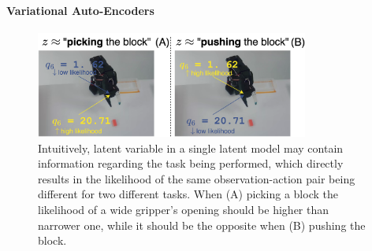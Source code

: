 \paragraph{Variational Auto-Encoders}

\begin{figure}
    \centering
    \includegraphics[width=0.8\textwidth]{figures/ch4/ch4-task-effect-on-pairs.png}
    \caption{Intuitively, latent variable in a single latent model may contain information regarding the task being performed, which directly results in the likelihood of the same observation-action pair being different for two different tasks. When (A) picking a block the likelihood of a wide gripper's opening should be higher than narrower one, while it should be the opposite when (B) pushing the block.}
    \label{fig:ch4-task-effect-on-pairs}
\end{figure}

